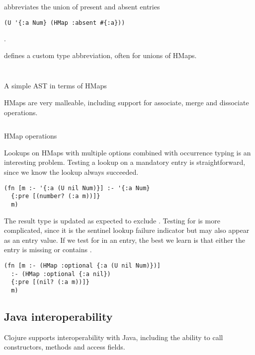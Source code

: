 abbreviates the union of present and absent entries

\smallskip
\begin{verbatim}
(U '{:a Num} (HMap :absent #{:a}))
\end{verbatim}
.


 defines a custom type abbreviation, often for unions of HMaps.

\begin{listing}
\inputminted[firstline=5,lastline=8]{clojure}{code/demo/src/demo/hmap.clj}
\inputminted[firstline=26,lastline=28]{clojure}{code/demo/src/demo/hmap.clj}
\caption{A simple AST in terms of HMaps}
\end{listing}


HMaps are very malleable, including support for associate, merge and dissociate operations.

\begin{listing}
\inputminted[firstline=10,lastline=24]{clojure}{code/demo/src/demo/hmap.clj}
\caption{HMap operations}
\end{listing}

Lookups on HMaps with multiple options combined with
occurrence typing is an interesting problem.
Testing a lookup on a mandatory entry is straightforward, since we
know the lookup always succeeded.

\begin{verbatim}
(fn [m :- '{:a (U nil Num)}] :- '{:a Num}
  {:pre [(number? (:a m))]}
  m)
\end{verbatim}

The result type is updated as expected to exclude .
Testing for  is more complicated, since it is the sentinel
lookup failure indicator but may also appear as an entry value.
If we test for  in an  entry, the best we learn
is that either the entry is missing or contains .

\begin{verbatim}
(fn [m :- (HMap :optional {:a (U nil Num)})] 
  :- (HMap :optional {:a nil})
  {:pre [(nil? (:a m))]}
  m)
\end{verbatim}

\subsection{Java interoperability}

Clojure supports interoperability with Java, including the ability to
call constructors, methods and access fields.


